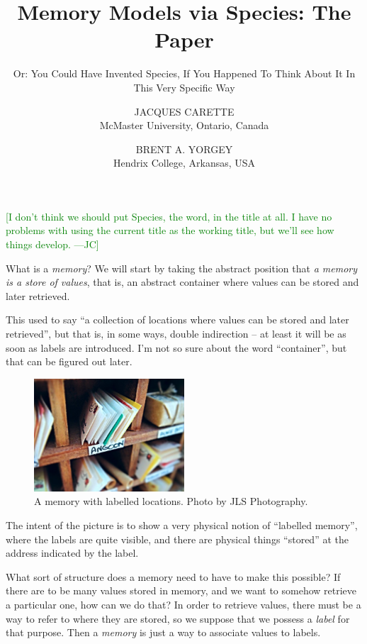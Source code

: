 \documentclass{jfp1}
\title{Memory Models via Species: The Paper}
\subtitle{Or: You Could Have Invented Species, If You Happened To Think
  About It In This Very Specific Way}
\author[J. Carette and B. A. Yorgey]{JACQUES CARETTE\\
  McMaster University, Ontario, Canada \\
  \email{carette@mcmaster.ca}
  \and BRENT A. YORGEY\\
  Hendrix College, Arkansas, USA\\
  \email{yorgey@hendrix.edu}}
\newcommand{\term}[1]{\emph{#1}}
\newcommand{\authornote}[3]{\textcolor{#1}{[#3 ---#2]}}
\newcommand{\authornote}[3]{}
\newcommand{\jc}[1]{\authornote{green}{JC}{#1}}  %
\begin{document}
\maketitle

\jc{I don't think we should put Species, the word,
  in the title at all. I have no problems with using the current
  title as the working title, but we'll see how things develop.}

What is a \term{memory}?  We will start by taking the abstract
position that \emph{a memory is a store of values}, that is,
an abstract container where values can be stored and later retrieved.

\begin{commentary}
  This used to say ``a collection of locations where
values can be stored and later retrieved'', but that is, in some
ways, double indirection -- at least it will be as soon as labels
are introduced.  I'm not so sure about the word ``container'', but
that can be figured out later.
\end{commentary}

\begin{figure}[htp]
  \centering
  \includegraphics[width=0.5\textwidth]{mailboxes.jpg}
  \caption{A memory with labelled locations. Photo by JLS Photography.\protect\footnotemark}
  \label{fig:mailboxes}
\end{figure}

\begin{commentary}
  The intent of the picture is to show a very physical
notion of ``labelled memory'', where the labels are quite
visible, and there are physical things ``stored'' at the address
indicated by the label.
\end{commentary}

What sort of structure does a memory need to have to make this
possible?  If there are to be many values stored in memory, and
we want to somehow retrieve a particular one, how can we do that?
In order to retrieve values, there must be a way to refer to where
they are stored, so we suppose that we possess a \emph{label}
for that purpose. Then a \term{memory}
is just a way to associate values to labels.
\end{document}
